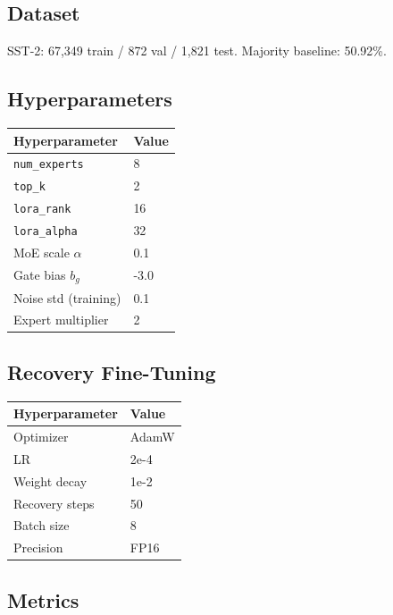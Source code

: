 \subsection{Dataset}

SST-2: 67,349 train / 872 val / 1,821 test. Majority baseline: 50.92\%.

\subsection{Hyperparameters}

\begin{table}[H]
\centering
\small
\begin{tabular}{ll}
\toprule
\textbf{Hyperparameter} & \textbf{Value} \\
\midrule
\texttt{num\_experts} & 8 \\
\texttt{top\_k} & 2 \\
\texttt{lora\_rank} & 16 \\
\texttt{lora\_alpha} & 32 \\
MoE scale $\alpha$ & 0.1 \\
Gate bias $b_g$ & -3.0 \\
Noise std (training) & 0.1 \\
Expert multiplier & 2 \\
\bottomrule
\end{tabular}
\end{table}

\subsection{Recovery Fine-Tuning}

\begin{table}[H]
\centering
\small
\begin{tabular}{ll}
\toprule
\textbf{Hyperparameter} & \textbf{Value} \\
\midrule
Optimizer & AdamW \\
LR & 2e-4 \\
Weight decay & 1e-2 \\
Recovery steps & 50 \\
Batch size & 8 \\
Precision & FP16 \\
\bottomrule
\end{tabular}
\end{table}

\subsection{Metrics}

